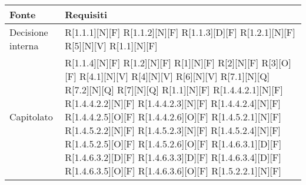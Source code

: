 
\begin{longtable}{X | X}  
			\rowcolor{orange!85}Fonte & Requisiti \\
\endhead
Decisione interna & R[1.1.1][N][F] \newline
R[1.1.2][N][F] \newline
R[1.1.3][D][F] \newline
R[1.2.1][N][F] \newline
R[5][N][V] \newline
R[1.1][N][F]  \\
\hline
Capitolato & R[1.1.4][N][F] \newline
R[1.2][N][F] \newline
R[1][N][F] \newline
R[2][N][F] \newline
R[3][O][F] \newline
R[4.1][N][V] \newline
R[4][N][V] \newline
R[6][N][V] \newline
R[7.1][N][Q] \newline
R[7.2][N][Q] \newline
R[7][N][Q] \newline
R[1.1][N][F] \newline
R[1.4.4.2.1][N][F] \newline
R[1.4.4.2.2][N][F] \newline
R[1.4.4.2.3][N][F] \newline
R[1.4.4.2.4][N][F] \newline
R[1.4.4.2.5][O][F] \newline
R[1.4.4.2.6][O][F] \newline
R[1.4.5.2.1][N][F] \newline
R[1.4.5.2.2][N][F] \newline
R[1.4.5.2.3][N][F] \newline
R[1.4.5.2.4][N][F] \newline
R[1.4.5.2.5][O][F] \newline
R[1.4.5.2.6][O][F] \newline
R[1.4.6.3.1][D][F] \newline
R[1.4.6.3.2][D][F] \newline
R[1.4.6.3.3][D][F] \newline
R[1.4.6.3.4][D][F] \newline
R[1.4.6.3.5][O][F] \newline
R[1.4.6.3.6][O][F] \newline
R[1.5.2.2.1][N][F] \newline

\end{longtable}
